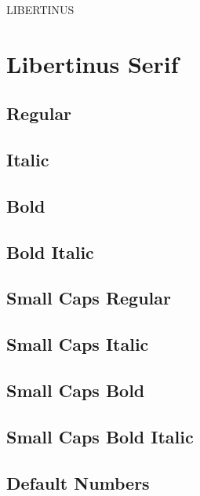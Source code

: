 \documentclass{article}
\begin{document}
\begin{center}\huge
{\libertinusDisplay LIBERTINUS}
\end{center}

\tableofcontents

\section{Libertinus Serif}


\subsection*{Regular}
\lipsum[1]

\subsection*{Italic}
\textit{\lipsum[2]} 

\subsection*{Bold}
\textbf{\lipsum[3]}

\subsection*{Bold Italic}

\textbf{\textit{\lipsum[4]}}


\subsection*{Small Caps Regular}
\textsc{\lipsum[5]}

\subsection*{Small Caps Italic}
\textsc{\textit{\lipsum[6]}}

\subsection*{Small Caps Bold}
\textsc{\textbf{\lipsum[7]}}

\subsection*{Small Caps Bold Italic}

\textsc{\textbf{\textit{\lipsum[8]}}}

\subsection*{Default Numbers}
\end{document}
